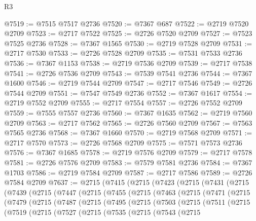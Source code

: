 \begin{lexlean}{R3}
\begin{coremodule}
@7519 := @7515 @7517 @2736
@7520 := @7367 @687
@7522 := @2719 @7520 @2709
@7523 := @2717 @7522
@7525 := @2726 @7520 @2709
@7527 := @7523 @7525 @2736
@7528 := @7367 @1565
@7530 := @2719 @7528 @2709
@7531 := @2717 @7530
@7533 := @2726 @7528 @2709
@7535 := @7531 @7533 @2736
@7536 := @7367 @1153
@7538 := @2719 @7536 @2709
@7539 := @2717 @7538
@7541 := @2726 @7536 @2709
@7543 := @7539 @7541 @2736
@7544 := @7367 @1600
@7546 := @2719 @7544 @2709
@7547 := @2717 @7546
@7549 := @2726 @7544 @2709
@7551 := @7547 @7549 @2736
@7552 := @7367 @1617
@7554 := @2719 @7552 @2709
@7555 := @2717 @7554
@7557 := @2726 @7552 @2709
@7559 := @7555 @7557 @2736
@7560 := @7367 @1635
@7562 := @2719 @7560 @2709
@7563 := @2717 @7562
@7565 := @2726 @7560 @2709
@7567 := @7563 @7565 @2736
@7568 := @7367 @1660
@7570 := @2719 @7568 @2709
@7571 := @2717 @7570
@7573 := @2726 @7568 @2709
@7575 := @7571 @7573 @2736
@7576 := @7367 @1685
@7578 := @2719 @7576 @2709
@7579 := @2717 @7578
@7581 := @2726 @7576 @2709
@7583 := @7579 @7581 @2736
@7584 := @7367 @1703
@7586 := @2719 @7584 @2709
@7587 := @2717 @7586
@7589 := @2726 @7584 @2709
@7637 := @2715
    (@7415
      (@2715
        (@7423
          (@2715
            (@7431
              (@2715
                (@7439
                  (@2715
                    (@7447
                      (@2715
                        (@7455
                          (@2715
                            (@7463
                              (@2715
                                (@7471
                                  (@2715
                                    (@7479
                                      (@2715
                                        (@7487
                                          (@2715
                                            (@7495
                                              (@2715
                                                (@7503
                                                  (@2715
                                                    (@7511
                                                      (@2715
                                                        (@7519
                                                          (@2715
                                                            (@7527
                                                              (@2715
                                                                (@7535
                                                                  (@2715
                                                                    (@7543
                                                                      (@2715

\end{coremodule}
\end{lexlean}
